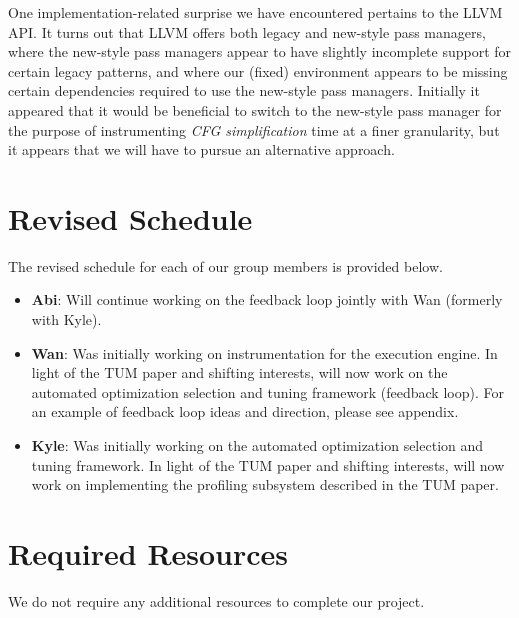 \documentclass{vldb}
\begin{document}
One implementation-related surprise we have encountered pertains to the LLVM API. It turns out that LLVM offers both legacy and new-style pass managers, where the new-style pass managers appear to have slightly incomplete support for certain legacy patterns, and where our (fixed) environment appears to be missing certain dependencies required to use the new-style pass managers. Initially it appeared that it would be beneficial to switch to the new-style pass manager for the purpose of instrumenting \textit{CFG simplification} time at a finer granularity, but it appears that we will have to pursue an alternative approach.


\section{Revised Schedule}

The revised schedule for each of our group members is provided below.

\begin{itemize}
    \item \textbf{Abi}: Will continue working on the feedback loop jointly with Wan (formerly with Kyle).
    \item \textbf{Wan}: Was initially working on instrumentation for the execution engine. In light of the TUM paper and shifting interests, will now work on the automated optimization selection and tuning framework (feedback loop). For an example of feedback loop ideas and direction, please see appendix.
    \item \textbf{Kyle}: Was initially working on the automated optimization selection and tuning framework. In light of the TUM paper and shifting interests, will now work on implementing the profiling subsystem described in the TUM paper.
\end{itemize}


\section{Required Resources}

We do not require any additional resources to complete our project.
\end{document}
